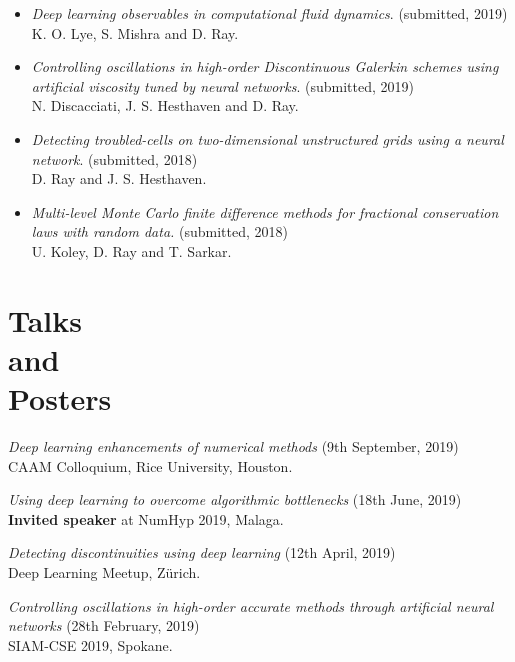 \documentclass[margin]{res}
\begin{document}
\begin{resume}
\begin{itemize}
               \item {\it Deep learning observables in computational fluid dynamics}. (submitted, 2019) \\
               K. O. Lye, S. Mishra and D. Ray.
               
               \item {\it Controlling oscillations in high-order Discontinuous Galerkin schemes using artificial viscosity tuned by neural networks}. (submitted, 2019) \\
               N. Discacciati, J. S. Hesthaven and D. Ray.
              
              \item {\it Detecting troubled-cells on two-dimensional unstructured grids using a neural network}. (submitted, 2018) \\
               D. Ray and J. S. Hesthaven.
           
              \item {\it Multi-level Monte Carlo finite difference methods for fractional conservation laws with random data.} (submitted, 2018)\\
              U. Koley, D. Ray and T. Sarkar.

             \end{itemize}

             
\section{Talks \\and \\Posters}
  
               {\it Deep learning enhancements of numerical methods} (9th September, 2019)\\
              CAAM Colloquium, Rice University, Houston.
              
              {\it Using deep learning to overcome algorithmic bottlenecks} (18th June, 2019)\\
              \textbf{Invited speaker} at NumHyp 2019, Malaga.
              
              {\it Detecting discontinuities using deep learning} (12th April, 2019)\\
              Deep Learning Meetup, Z\"{u}rich.
                         
             {\it Controlling oscillations in high-order accurate methods through artificial neural networks} (28th February, 2019)\\
              SIAM-CSE 2019, Spokane.
              

\end{resume}
\end{document}
